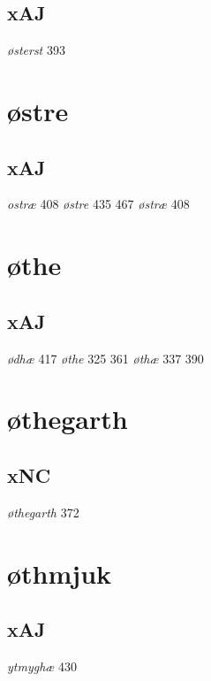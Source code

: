 \documentclass[a4paper,twocolumn]{article}
\begin{document}
\subsection{xAJ}
\label{sec:org905ebe9}
\emph{østerst} 393 
\section{østre}
\label{sec:org5c33eef}
\subsection{xAJ}
\label{sec:org5412993}
\emph{ostræ} 408 \emph{østre} 435 467 \emph{østræ} 408 
\section{øthe}
\label{sec:orgd75c525}
\subsection{xAJ}
\label{sec:orgfc03b00}
\emph{ødhæ} 417 \emph{øthe} 325 361 \emph{øthæ} 337 390 
\section{øthegarth}
\label{sec:orgaa11123}
\subsection{xNC}
\label{sec:org9a6af4c}
\emph{øthegarth} 372 
\section{øthmjuk}
\label{sec:org68edd53}
\subsection{xAJ}
\label{sec:orgc958f90}
\emph{ytmyghæ} 430 
\end{document}
